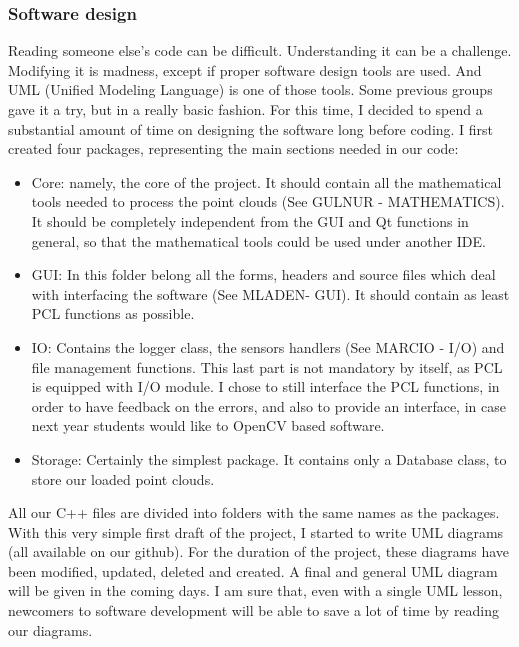 \documentclass[aps,letterpaper,11pt]{revtex4}
\begin{document}
\subsubsection{Software design}
Reading someone else’s code can be difficult. Understanding it can be a challenge. Modifying it is madness, except if proper software design tools are used. And UML (Unified Modeling Language) is one of those tools. Some previous groups gave it a try, but in a really basic fashion. For this time, I decided to spend a substantial amount of time on designing the software long before coding. I first created four packages, representing the main sections needed in our code:
\begin{itemize}
\item Core: namely, the core of the project. It should contain all the mathematical tools needed to process the point clouds (See GULNUR - MATHEMATICS). It should be completely independent from the GUI and Qt functions in general, so that the mathematical tools could be used under another IDE.
\item GUI: In this folder belong all the forms, headers and source files which deal with interfacing the software (See MLADEN- GUI). It should contain as least PCL functions as possible.
\item IO: Contains the logger class, the sensors handlers (See MARCIO - I/O)  and file management functions. This last part is not mandatory by itself, as PCL is equipped with I/O module. I chose to still interface the PCL functions, in order to have feedback on the errors, and also to provide an interface, in case next year students would like to OpenCV based software.
\item Storage: Certainly the simplest package. It contains only a Database class, to store our loaded point clouds.
\end{itemize}
All our C++ files are divided into folders with the same names as the packages. 
With this very simple first draft of the project, I started to write UML diagrams (all available on our github). For the duration of the project, these diagrams have been modified, updated, deleted and created. A final and general UML diagram will be given in the coming days. I am sure that, even with a single UML lesson, newcomers to software development will be able to save a lot of time by reading our diagrams.
\end{document}

